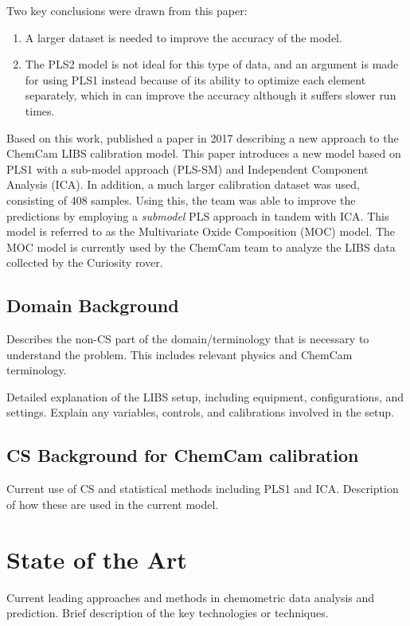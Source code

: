 Two key conclusions were drawn from this paper:
\begin{enumerate}
    \item A larger dataset is needed to improve the accuracy of the model.
    \item The PLS2 model is not ideal for this type of data, and an argument is made for using PLS1 instead because of its ability to optimize each element separately, which in can improve the accuracy although it suffers slower run times.
\end{enumerate}

Based on this work, \citeauthor{cleggRecalibrationMarsScience2017} published a paper in 2017 describing a new approach to the ChemCam LIBS calibration model.
This paper introduces a new model based on PLS1 with a sub-model approach (PLS-SM) and Independent Component Analysis (ICA).
In addition, a much larger calibration dataset was used, consisting of 408 samples.
Using this, the team was able to improve the predictions by employing a \textit{submodel} PLS approach in tandem with ICA.
This model is referred to as the Multivariate Oxide Composition (MOC) model.
The MOC model is currently used by the ChemCam team to analyze the LIBS data collected by the Curiosity rover.

\subsection{Domain Background}
Describes the non-CS part of the domain/terminology that is necessary to understand the problem.
This includes relevant physics and ChemCam terminology.

Detailed explanation of the LIBS setup, including equipment, configurations, and settings.
Explain any variables, controls, and calibrations involved in the setup.

\subsection{CS Background for ChemCam calibration}
Current use of CS and statistical methods including PLS1 and ICA.
Description of how these are used in the current model.

\section{State of the Art}
Current leading approaches and methods in chemometric data analysis and prediction.
Brief description of the key technologies or techniques.

